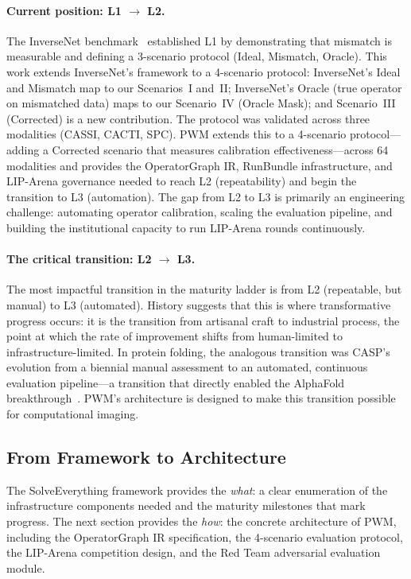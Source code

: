\paragraph{Current position: L1 $\to$ L2.}
The InverseNet benchmark~\cite{yang2026inversenet} established L1 by
demonstrating that mismatch is measurable and defining a 3-scenario
protocol (Ideal, Mismatch, Oracle). This work extends InverseNet's framework to a 4-scenario protocol: InverseNet's Ideal and Mismatch map to our Scenarios~I and~II; InverseNet's Oracle (true operator on mismatched data) maps to our Scenario~IV (Oracle Mask); and Scenario~III (Corrected) is a new contribution. The protocol was validated across three modalities (CASSI, CACTI, SPC).
PWM extends this to a 4-scenario protocol---adding a Corrected scenario
that measures calibration effectiveness---across 64 modalities and
provides the OperatorGraph IR, RunBundle infrastructure, and LIP-Arena
governance needed to reach L2 (repeatability) and begin the transition
to L3 (automation).
The gap from L2 to L3 is primarily an engineering challenge:
automating operator calibration, scaling the evaluation pipeline, and
building the institutional capacity to run LIP-Arena rounds
continuously.

\paragraph{The critical transition: L2 $\to$ L3.}
The most impactful transition in the maturity ladder is from L2
(repeatable, but manual) to L3 (automated).
History suggests that this is where transformative progress occurs: it
is the transition from artisanal craft to industrial process, the point
at which the rate of improvement shifts from human-limited to
infrastructure-limited.
In protein folding, the analogous transition was CASP's evolution from
a biennial manual assessment to an automated, continuous evaluation
pipeline---a transition that directly enabled the AlphaFold
breakthrough~\cite{jumper2021alphafold}.
PWM's architecture is designed to make this transition possible for
computational imaging.

\subsection{From Framework to Architecture}
\label{sec:framework_to_arch}

The SolveEverything framework provides the \emph{what}: a clear
enumeration of the infrastructure components needed and the maturity
milestones that mark progress.
The next section provides the \emph{how}: the concrete architecture of
PWM, including the OperatorGraph IR specification, the 4-scenario
evaluation protocol, the LIP-Arena competition design, and the Red Team
adversarial evaluation module.
